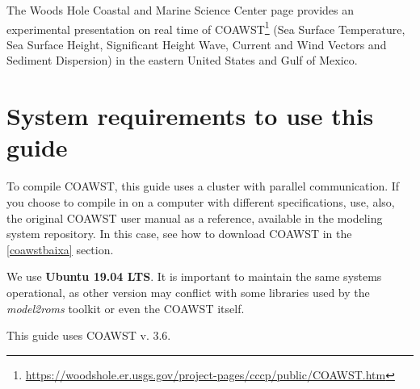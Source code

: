  The Woods Hole Coastal and Marine Science Center page provides an experimental presentation on real time of 
COAWST\textcolor{bleu_cite}{\textit{}\footnote{\textcolor{bleu_cite}{\href{https://woodshole.er.usgs.gov/project-pages/cccp/public/COAWST.htm}{https://woodshole.er.usgs.gov/project-pages/cccp/public/COAWST.htm}}}}
(Sea Surface Temperature, Sea Surface Height, Significant Height Wave, Current and Wind Vectors and Sediment Dispersion) in the eastern United States and Gulf of Mexico.
\bigskip

\section{System requirements to use this guide}
\bigskip

 To compile COAWST, this guide uses a cluster with parallel communication. If you choose to compile in
on a computer with different specifications, use, also, the original COAWST user manual as a reference, available in the modeling system repository. In this case,
see how to download COAWST in the \textcolor{bleu_cite}{\ref{coawstbaixa}} section.
\bigskip

 We use \textbf{Ubuntu 19.04 LTS}. It is important to maintain the same systems operational, as other version may conflict with some libraries used by the \textit{model2roms} toolkit or 
even the COAWST itself.
\bigskip

\begin{tcolorbox}[enhanced,
    grow to left by=0cm,%
    grow to right by=0cm,%
    enlarge top by=0cm,%
    enlarge bottom by=0cm,%
    tcbox raise base,
    boxrule=1.0pt,
    left=18mm,
    colframe=red!50!black,coltext=red!25!black,colback=red!10!white,
    overlay={\begin{tcbclipinterior}\fill[red!75!blue!50!white] (frame.south west)
      rectangle node[text=white,font=\sffamily\bfseries\footnotesize,rotate=0] {WARNING} ([xshift=18mm]frame.north west);\end{tcbclipinterior}}]
      This guide uses COAWST v. 3.6.
  \end{tcolorbox}
  \bigskip